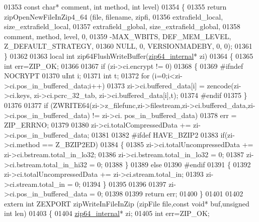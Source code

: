 \begin{DoxyCode}
01353                                         \textcolor{keyword}{const} \textcolor{keywordtype}{char}* comment, \textcolor{keywordtype}{int} method, \textcolor{keywordtype}{int} level)
01354 \{
01355     \textcolor{keywordflow}{return} zipOpenNewFileInZip4\_64 (file, filename, zipfi,
01356                                  extrafield\_local, size\_extrafield\_local,
01357                                  extrafield\_global, size\_extrafield\_global,
01358                                  comment, method, level, 0,
01359                                  -MAX\_WBITS, DEF\_MEM\_LEVEL, Z\_DEFAULT\_STRATEGY,
01360                                  NULL, 0, VERSIONMADEBY, 0, 0);
01361 \}
01362 
01363 local \textcolor{keywordtype}{int} zip64FlushWriteBuffer(\hyperlink{structzip64__internal}{zip64\_internal}* zi)
01364 \{
01365     \textcolor{keywordtype}{int} err=ZIP\_OK;
01366 
01367     \textcolor{keywordflow}{if} (zi->ci.encrypt != 0)
01368     \{
01369 \textcolor{preprocessor}{#ifndef NOCRYPT}
01370         uInt i;
01371         \textcolor{keywordtype}{int} t;
01372         \textcolor{keywordflow}{for} (i=0;i<zi->ci.pos\_in\_buffered\_data;i++)
01373             zi->ci.buffered\_data[i] = zencode(zi->ci.keys, zi->ci.pcrc\_32\_tab, zi->ci.buffered\_data[i],t);
01374 \textcolor{preprocessor}{#endif}
01375     \}
01376 
01377     \textcolor{keywordflow}{if} (ZWRITE64(zi->z\_filefunc,zi->filestream,zi->ci.buffered\_data,zi->ci.pos\_in\_buffered\_data) != zi->ci.
      pos\_in\_buffered\_data)
01378       err = ZIP\_ERRNO;
01379 
01380     zi->ci.totalCompressedData += zi->ci.pos\_in\_buffered\_data;
01381 
01382 \textcolor{preprocessor}{#ifdef HAVE\_BZIP2}
01383     \textcolor{keywordflow}{if}(zi->ci.method == Z\_BZIP2ED)
01384     \{
01385       zi->ci.totalUncompressedData += zi->ci.bstream.total\_in\_lo32;
01386       zi->ci.bstream.total\_in\_lo32 = 0;
01387       zi->ci.bstream.total\_in\_hi32 = 0;
01388     \}
01389     \textcolor{keywordflow}{else}
01390 \textcolor{preprocessor}{#endif}
01391     \{
01392       zi->ci.totalUncompressedData += zi->ci.stream.total\_in;
01393       zi->ci.stream.total\_in = 0;
01394     \}
01395 
01396 
01397     zi->ci.pos\_in\_buffered\_data = 0;
01398 
01399     \textcolor{keywordflow}{return} err;
01400 \}
01401 
01402 \textcolor{keyword}{extern} \textcolor{keywordtype}{int} ZEXPORT zipWriteInFileInZip (zipFile file,\textcolor{keyword}{const} \textcolor{keywordtype}{void}* buf,\textcolor{keywordtype}{unsigned} \textcolor{keywordtype}{int} len)
01403 \{
01404     \hyperlink{structzip64__internal}{zip64\_internal}* zi;
01405     \textcolor{keywordtype}{int} err=ZIP\_OK;

\end{DoxyCode}
